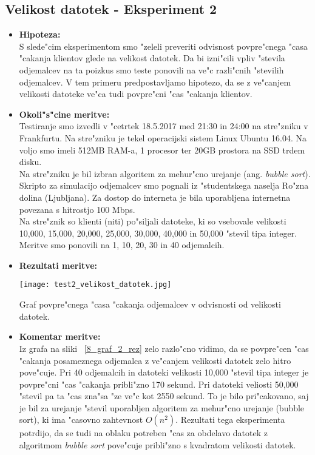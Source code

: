 \subsection{Velikost datotek - Eksperiment 2}
\label{8_subsec:eksperiment_2}
\begin{itemize}
	\item \textbf{Hipoteza: }  \\
		S slede"cim eksperimentom smo "zeleli preveriti odvisnost povpre"cnega "casa "cakanja klientov glede na velikost datotek. Da bi izni"cili vpliv "stevila odjemalcev na ta poizkus smo teste ponovili na ve"c razli"cnih "stevilih odjemalcev. V tem primeru predpostavljamo hipotezo, da se z ve"canjem velikosti datoteke ve"ca tudi povpre"cni "cas "cakanja klientov. 
			
	\item \textbf{Okoli"s"cine meritve: } \\
		Testiranje smo izvedli v "cetrtek 18.5.2017 med 21:30 in 24:00 na stre"zniku v Frankfurtu. Na stre"zniku je tekel operacijski sistem Linux Ubuntu 16.04. Na voljo smo imeli 512MB RAM-a, 1 procesor ter 20GB prostora na SSD trdem disku.\\ Na stre"zniku je bil izbran algoritem za mehur"cno urejanje (ang. \textit{bubble sort}). Skripto za simulacijo odjemalcev smo pognali iz "studentskega naselja Ro"zna dolina (Ljubljana). Za dostop do interneta je bila uporabljena internetna povezana s hitrostjo 100 Mbps.\\ Na stre"znik so klienti (niti) po"siljali datoteke, ki so vsebovale velikosti 10,000, 15,000, 20,000, 25,000, 30,000, 40,000 in 50,000 "stevil tipa integer. Meritve smo ponovili na 1, 10, 20, 30 in 40 odjemalcih.  

 	\item \textbf{Rezultati meritve: }  \\
 	
    \begin{table}[!h]
      \centering
        \texttt{[image: test2\_velikost\_datotek.jpg]}
      \caption{Graf povpre"cnega "casa "cakanja odjemalcev v odvisnosti od velikosti datotek.}		
      \label{8_graf_2_rez}
    \end{table}
		
    \pagebreak
	\item \textbf{Komentar meritve: } \\ 
		Iz grafa na sliki ~\ref{8_graf_2_rez} zelo razlo"cno vidimo, da se povpre"cen "cas "cakanja posameznega odjemalca z ve"canjem velikosti datotek zelo hitro pove"cuje. Pri 40 odjemalcih in datoteki velikosti 10,000 "stevil tipa integer je povpre"cni "cas "cakanja pribli"zno 170 sekund. Pri datoteki veliosti 50,000 "stevil pa ta "cas zna"sa "ze ve"c kot 2550 sekund. To je bilo pri"cakovano, saj je bil za urejanje "stevil uporabljen algoritem za mehur"cno urejanje (bubble sort), ki ima "casovno zahtevnost $O(n^2)$. Rezultati tega eksperimenta potrdijo, da se tudi na oblaku potreben "cas za obdelavo datotek z algoritmom \textit{bubble sort} pove"cuje pribli"zno s kvadratom velikosti datotek. 
\end{itemize}

